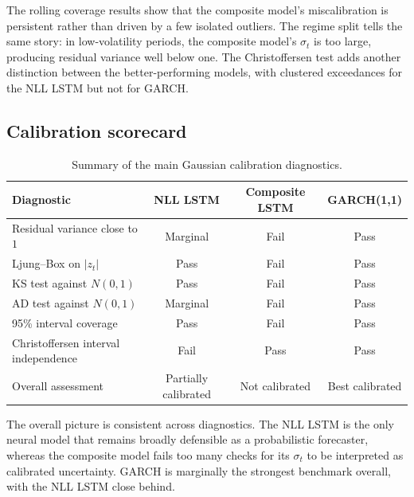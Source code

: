 \documentclass[%
 amsmath,amssymb,
 aps,
 pra,
 floatfix,
 raggedbottom,
 nofootinbib,
12pt,]{revtex4-2}
\begin{document}
The rolling coverage results show that the composite model's miscalibration is persistent rather than driven by a few isolated outliers. The regime split tells the same story: in low-volatility periods, the composite model's $\sigma_t$ is too large, producing residual variance well below one. The Christoffersen test adds another distinction between the better-performing models, with clustered exceedances for the NLL LSTM but not for GARCH.

\subsection{Calibration scorecard}

\begin{table}[!b]
\centering
\caption{Summary of the main Gaussian calibration diagnostics.}
\label{tab:scorecard}
\begin{ruledtabular}
{\small
\setlength{\tabcolsep}{3pt}
\renewcommand{\arraystretch}{0.94}
\begin{tabular}{lccc}
\textbf{Diagnostic} & \textbf{NLL LSTM} & \textbf{Composite LSTM} & \textbf{GARCH(1,1)} \\
\hline
Residual variance close to $1$        & Marginal & Fail & Pass \\
Ljung--Box on $|z_t|$                 & Pass     & Fail & Pass \\
KS test against $N(0,1)$             & Pass     & Fail & Pass \\
AD test against $N(0,1)$             & Marginal & Fail & Pass \\
95\% interval coverage               & Pass     & Fail & Pass \\
Christoffersen interval independence  & Fail     & Pass & Pass \\
\hline
Overall assessment                    & Partially calibrated & Not calibrated & Best calibrated \\
\end{tabular}
}
\end{ruledtabular}
\end{table}

The overall picture is consistent across diagnostics. The NLL LSTM is the only neural model that remains broadly defensible as a probabilistic forecaster, whereas the composite model fails too many checks for its $\sigma_t$ to be interpreted as calibrated uncertainty. GARCH is marginally the strongest benchmark overall, with the NLL LSTM close behind.
\end{document}
